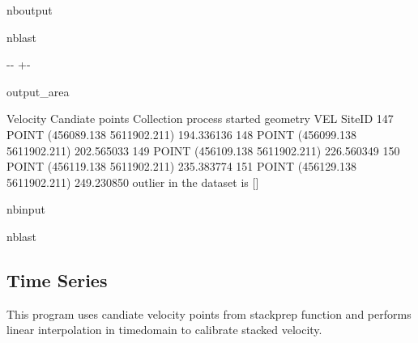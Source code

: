 \documentclass[letterpaper,10pt]{sphinxmanual}
\newlength\nbsphinxcodecellspacing
\begin{document}
\begin{sphinxuseclass}{nboutput}
\begin{sphinxuseclass}{nblast}
{

\kern-\sphinxverbatimsmallskipamount\kern-\baselineskip
\kern+\FrameHeightAdjust\kern-\fboxrule
\vspace{\nbsphinxcodecellspacing}

\begin{sphinxuseclass}{output_area}
\begin{sphinxuseclass}{}


\begin{sphinxVerbatim}[commandchars=\\\{\}]
Velocity Candiate points Collection process started
                              geometry         VEL
SiteID
147     POINT (456089.138 5611902.211)  194.336136
148     POINT (456099.138 5611902.211)  202.565033
149     POINT (456109.138 5611902.211)  226.560349
150     POINT (456119.138 5611902.211)  235.383774
151     POINT (456129.138 5611902.211)  249.230850
 outlier in the dataset is []
\end{sphinxVerbatim}



\end{sphinxuseclass}
\end{sphinxuseclass}
}

\end{sphinxuseclass}
\end{sphinxuseclass}
\begin{sphinxuseclass}{nbinput}
\begin{sphinxuseclass}{nblast}
{
\begin{sphinxVerbatim}[commandchars=\\\{\}]
\llap{\color{nbsphinxin}[ ]:\,\hspace{\fboxrule}\hspace{\fboxsep}}
\end{sphinxVerbatim}
}

\end{sphinxuseclass}
\end{sphinxuseclass}


\sphinxstepscope


\subsection{Time Series}
\label{\detokenize{notebooks/Time_Series:Time-Series}}\label{\detokenize{notebooks/Time_Series::doc}}
\sphinxAtStartPar
This program uses candiate velocity points from stackprep function and performs linear interpolation in time\sphinxhyphen{}domain to calibrate stacked velocity.
\end{document}

